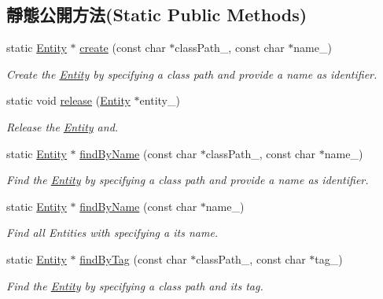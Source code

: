 \subsection*{靜態公開方法(Static Public Methods)}
\begin{DoxyCompactItemize}
\item 
static \hyperlink{class_i_dream_sky_1_1_entity}{Entity} $\ast$ \hyperlink{class_i_dream_sky_1_1_entity_a23b08d85a88f3346ca1833ebd8a48b61}{create} (const char $\ast$class\+Path\+\_\+, const char $\ast$name\+\_\+)
\begin{DoxyCompactList}\small\item\em Create the \hyperlink{class_i_dream_sky_1_1_entity}{Entity} by specifying a class path and provide a name as identifier. \end{DoxyCompactList}\item 
static void \hyperlink{class_i_dream_sky_1_1_entity_a055ac09f7e01765eaa8894723c3024c5}{release} (\hyperlink{class_i_dream_sky_1_1_entity}{Entity} $\ast$entity\+\_\+)
\begin{DoxyCompactList}\small\item\em Release the \hyperlink{class_i_dream_sky_1_1_entity}{Entity} and. \end{DoxyCompactList}\item 
static \hyperlink{class_i_dream_sky_1_1_entity}{Entity} $\ast$ \hyperlink{class_i_dream_sky_1_1_entity_a2498f266d451dc9666c12b8e7c9b456d}{find\+By\+Name} (const char $\ast$class\+Path\+\_\+, const char $\ast$name\+\_\+)
\begin{DoxyCompactList}\small\item\em Find the \hyperlink{class_i_dream_sky_1_1_entity}{Entity} by specifying a class path and provide a name as identifier. \end{DoxyCompactList}\item 
static \hyperlink{class_i_dream_sky_1_1_entity}{Entity} $\ast$ \hyperlink{class_i_dream_sky_1_1_entity_aebb48b61877838c79db84676a8c8f2f6}{find\+By\+Name} (const char $\ast$name\+\_\+)
\begin{DoxyCompactList}\small\item\em Find all Entities with specifying a its name. \end{DoxyCompactList}\item 
static \hyperlink{class_i_dream_sky_1_1_entity}{Entity} $\ast$ \hyperlink{class_i_dream_sky_1_1_entity_af11cacde05a933a1ac7663d4956d2e25}{find\+By\+Tag} (const char $\ast$class\+Path\+\_\+, const char $\ast$tag\+\_\+)
\begin{DoxyCompactList}\small\item\em Find the \hyperlink{class_i_dream_sky_1_1_entity}{Entity} by specifying a class path and its tag. \end{DoxyCompactList}\item 

\end{DoxyCompactItemize}
